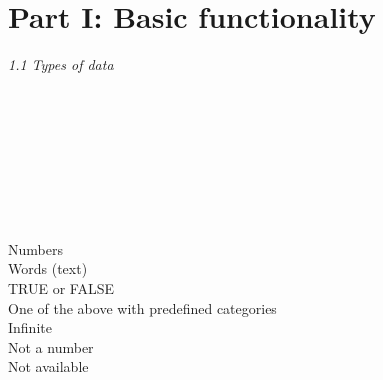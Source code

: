 

\label{rhelp}

\section{Part I: Basic functionality}

\textit{1.1 Types of data} \\
\\
\begin{minipage}[t]{.4\textwidth}
\vspace*{-8pt}
 \\
 \\
 \\
 \\ 			
 \\					
 \\ 					 
\end{minipage}
\begin{minipage}[t]{.6\textwidth}
Numbers \\
Words (text) \\
TRUE or FALSE \\
One of the above with predefined categories \\
Infinite \\
Not a number \\
Not available
\end{minipage}
\vspace*{.5cm}

